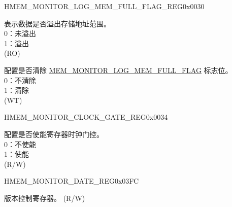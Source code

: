 \begin{register}{H}{MEM\_MONITOR\_LOG\_MEM\_FULL\_FLAG\_REG}{0x0030}\label{regdesc:MEMMONITORLOGMEMFULLFLAGREG}
%
%
%
\regnewline%
\begin{regdesc}\begin{reglist}
\label{fielddesc:MEMMONITORLOGMEMFULLFLAG}\item [MEM\_MONITOR\_LOG\_MEM\_FULL\_FLAG] 表示数据是否溢出存储地址范围。\\
0：未溢出\\
1：溢出\\ (RO)
\label{fielddesc:MEMMONITORCLRLOGMEMFULLFLAG}\item [MEM\_MONITOR\_CLR\_LOG\_MEM\_FULL\_FLAG] 配置是否清除 \hyperref[fielddesc:MEMMONITORLOGMEMFULLFLAG]{MEM\_MONITOR\_LOG\_MEM\_FULL\_FLAG} 标志位。\\
0：不清除\\
1：清除\\ (WT)
\end{reglist}\end{regdesc}
\end{register}


\begin{register}{H}{MEM\_MONITOR\_CLOCK\_GATE\_REG}{0x0034}\label{regdesc:MEMMONITORCLOCKGATEREG}
%
%
\regnewline%
\begin{regdesc}\begin{reglist}
\label{fielddesc:MEMMONITORCLKEN}\item [MEM\_MONITOR\_CLK\_EN] 配置是否使能寄存器时钟门控。\\
0：不使能\\
1：使能\\ (R/W)
\end{reglist}\end{regdesc}
\end{register}


\begin{register}{H}{MEM\_MONITOR\_DATE\_REG}{0x03FC}\label{regdesc:MEMMONITORDATEREG}
%
%
\regnewline%
\begin{regdesc}\begin{reglist}
\label{fielddesc:MEMMONITORDATE}\item [MEM\_MONITOR\_DATE] 版本控制寄存器。 (R/W)
\end{reglist}\end{regdesc}
\end{register}
